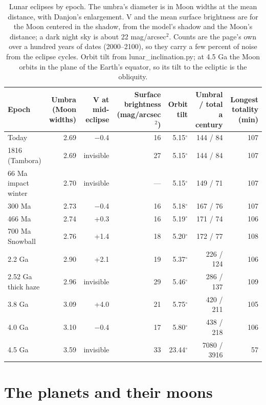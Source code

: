 \documentclass[9pt,twocolumn]{extarticle}
\begin{document}
\begin{table}[tp]\centering\footnotesize
\caption{Lunar eclipses by epoch. The umbra's diameter is in Moon widths at the mean distance, with Danjon's enlargement. V and the mean surface brightness are for the Moon centered in the shadow, from the model's shadow and the Moon's distance; a dark night sky is about 22 mag/arcsec$^{2}$. Counts are the page's own over a hundred years of dates (2000--2100), so they carry a few percent of noise from the eclipse cycles. Orbit tilt from lunar\_inclination.py; at 4.5 Ga the Moon orbits in the plane of the Earth's equator, so its tilt to the ecliptic is the obliquity.}\label{tab:lunar}
\begin{tabularx}{\textwidth}{@{}Yrrrrrr@{}}\toprule
Epoch & Umbra (Moon widths) & V at mid-eclipse & Surface brightness (mag/arcsec$^{2}$) & Orbit tilt & Umbral / total a century & Longest totality (min) \\ \midrule
Today & 2.69 & $-$0.4 & 16 & 5.15$^\circ$ & 144 / 84 & 107 \\
1816 (Tambora) & 2.69 & invisible & 27 & 5.15$^\circ$ & 144 / 84 & 107 \\
66 Ma impact winter & 2.70 & invisible & --- & 5.15$^\circ$ & 149 / 71 & 107 \\
300 Ma & 2.73 & $-$0.4 & 16 & 5.18$^\circ$ & 167 / 76 & 107 \\
466 Ma & 2.74 & +0.3 & 16 & 5.19$^\circ$ & 171 / 74 & 106 \\
700 Ma Snowball & 2.76 & +1.4 & 18 & 5.20$^\circ$ & 172 / 77 & 108 \\
2.2 Ga & 2.90 & +2.1 & 19 & 5.37$^\circ$ & 226 / 124 & 106 \\
2.52 Ga thick haze & 2.96 & invisible & 29 & 5.46$^\circ$ & 286 / 137 & 109 \\
3.8 Ga & 3.09 & +4.0 & 21 & 5.75$^\circ$ & 420 / 211 & 105 \\
4.0 Ga & 3.10 & $-$0.4 & 17 & 5.80$^\circ$ & 438 / 218 & 106 \\
4.5 Ga & 3.59 & invisible & 33 & 23.44$^\circ$ & 7080 / 3916 & 57 \\
\bottomrule\end{tabularx}
\end{table}


\section{The planets and their moons}\label{planets}
\end{document}
